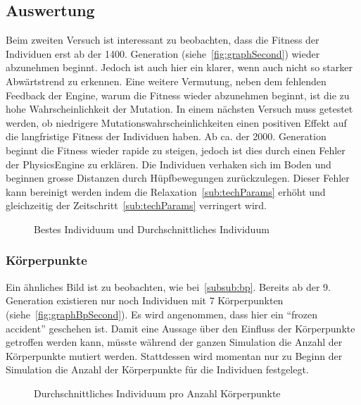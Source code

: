     \subsection{Auswertung\label{sub:scndAuswertung}}

      Beim zweiten Versuch ist interessant zu beobachten,
      dass die Fitness der Individuen erst ab der 1400\@. Generation (siehe~\vref{fig:graphSecond})
      wieder abzunehmen beginnt.
      Jedoch ist auch hier ein klarer, wenn auch nicht so starker Abwärtstrend zu erkennen.
      Eine weitere Vermutung, neben dem fehlenden Feedback der Engine, warum die Fitness wieder abzunehmen beginnt,
      ist die zu hohe Wahrscheinlichkeit der Mutation.
      In einem nächsten Versuch muss getestet werden,
      ob niedrigere Mutationswahrscheinlichkeiten einen positiven Effekt auf die langfristige Fitness der Individuen haben.
      Ab ca\@. der 2000\@. Generation beginnt die Fitness wieder rapide zu steigen,
      jedoch ist dies durch einen Fehler der \gls{PhysicsEngine} zu erklären.
      Die Individuen verhaken sich im Boden und beginnen grosse Distanzen durch Hüpfbewegungen zurückzulegen.
      Dieser Fehler kann bereinigt werden indem die Relaxation~\vref{sub:techParams} erhöht und
      gleichzeitig der Zeitschritt~\vref{sub:techParams} verringert wird.

      \begin{figure}[H]
        \centering
        
        \caption{Bestes Individuum und Durchschnittliches Individuum\label{fig:graphSecond}}
      \end{figure}

      \subsubsection{Körperpunkte\label{subsub:bpScnd}}

        Ein ähnliches Bild ist zu beobachten, wie bei~\vref{subsub:bp}.
        Bereits ab der 9\@. Generation existieren nur noch Individuen mit 7 Körperpunkten (siehe~\vref{fig:graphBpSecond}).
        Es wird angenommen, dass hier ein ``frozen accident'' geschehen ist.
        Damit eine Aussage über den Einfluss der Körperpunkte getroffen werden kann,
        müsste während der ganzen Simulation die Anzahl der Körperpunkte mutiert werden.
        Stattdessen wird momentan nur zu Beginn der Simulation die Anzahl der Körperpunkte für die Individuen festgelegt.

        \begin{figure}[H]
          \centering
          
          \caption{Durchschnittliches Individuum pro Anzahl Körperpunkte\label{fig:graphBpSecond}}
        \end{figure}

